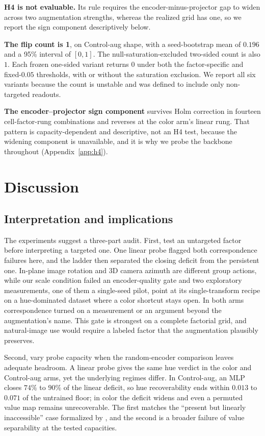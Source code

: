 \documentclass[10pt]{article}
\begin{document}
\textbf{H4 is not evaluable.} Its rule requires the encoder-minus-projector gap to widen across two
augmentation strengths, whereas the realized grid has one, so we report the sign component descriptively below.

\textbf{The flip count is 1}, on Control-aug shape, with a seed-bootstrap mean of $0.196$ and a
95\% interval of $[0,1]$. The null-saturation-excluded two-sided count is also $1$. Each frozen
one-sided variant returns $0$ under both the factor-specific and fixed-$0.05$ thresholds, with or
without the saturation exclusion. We report all six variants because the count is unstable and was
defined to include only non-targeted readouts.

\textbf{The encoder--projector sign component}\label{sec:h4} survives Holm correction in fourteen
cell-factor-rung combinations and reverses at the color arm's linear rung. That pattern is
capacity-dependent and descriptive, not an H4 test, because the widening component is unavailable,
and it is why we probe the backbone throughout (Appendix~\ref{app:h4}).

\section{Discussion}
\label{sec:discussion}

\subsection{Interpretation and implications}
The experiments suggest a three-part audit. First, test an untargeted factor before interpreting a
targeted one. One linear probe flagged both
correspondence failures here, and the ladder then separated the closing deficit from the
persistent one. In-plane image rotation and 3D camera azimuth are different group actions, while our
scale condition failed an encoder-quality gate and
two exploratory measurements, one of them a single-seed pilot, point at its single-transform recipe
on a hue-dominated dataset where a color shortcut stays open. In both arms correspondence turned on
a measurement or an
argument beyond the augmentation's name. This gate is strongest on a complete factorial grid, and
natural-image use would require a labeled factor that
the augmentation plausibly preserves.

Second, vary probe capacity when the random-encoder comparison leaves adequate headroom. A linear
probe gives the same hue verdict in the color and Control-aug arms, yet the underlying regimes
differ. In Control-aug, an MLP closes $74\%$ to $90\%$ of the linear deficit, so hue recoverability
ends within $0.013$ to $0.071$ of the untrained floor; in color the deficit widens and even a
permuted value map remains unrecoverable. The first matches the ``present but linearly
inaccessible'' case formalized by \citet{belrose2023leace}, and the second is a broader failure of
value separability at the tested capacities.
\end{document}
